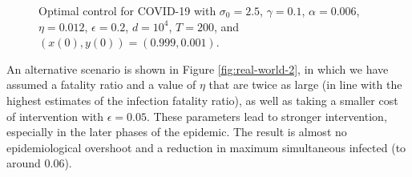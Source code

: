\documentclass[english,12pt,letter]{article}
\newcommand{\Rnot}{\sigma_0}
\begin{document}
\begin{figure}
    \centering
    \caption{Optimal control for COVID-19 with $\Rnot=2.5$, $\gamma=0.1$,
                $\alpha=0.006$, $\eta=0.012$, $\epsilon=0.2$, $d=10^4$, $T=200$, and $(x(0),y(0)) =
                (0.999,0.001)$.\label{fig:real-world-1}}
\end{figure}

An alternative scenario is shown in Figure \ref{fig:real-world-2}, in which
we have assumed a fatality ratio and a value of $\eta$ that are twice as
large (in line with the highest estimates of the infection fatality ratio),
as well as taking a smaller cost of intervention with $\epsilon=0.05$.  These
parameters lead to stronger intervention, especially in the later phases of the epidemic.
The result is almost no epidemiological overshoot and a reduction in
maximum simultaneous infected (to around $0.06$).
\end{document}
